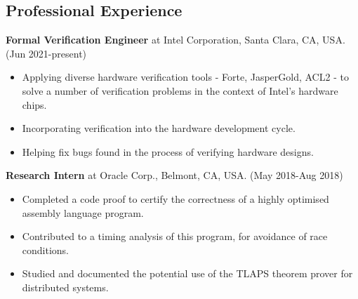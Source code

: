 \documentclass[margin]{res}
\begin{document}


\address{+1 512-952-0104 \\ \url{www.cs.utexas.edu/~mihir} \\ mihir@cs.utexas.edu}


\begin{resume}


\section{Professional Experience}

 {\bf Formal Verification Engineer} at Intel Corporation, Santa Clara,
 CA, USA. \hfill (Jun 2021-present)
 \begin{itemize} \itemsep -2pt  %
 \item Applying diverse hardware verification tools - Forte,
   JasperGold, ACL2 - to solve a number of verification problems in
   the context of Intel's hardware chips.
 \item Incorporating verification into the hardware development cycle.
 \item Helping fix bugs found in the process of verifying hardware designs.
 \end{itemize}

 {\bf Research Intern} at Oracle Corp., Belmont, CA, USA. \hfill (May
 2018-Aug 2018)
 \begin{itemize} \itemsep -2pt  %
 \item Completed a code proof to certify the correctness of a highly
   optimised assembly language program.
 \item Contributed to a timing analysis of this program, for
   avoidance of race conditions.
 \item Studied and documented the potential use of the TLAPS theorem prover for
   distributed systems.
 \end{itemize}


\end{resume}
\end{document}
